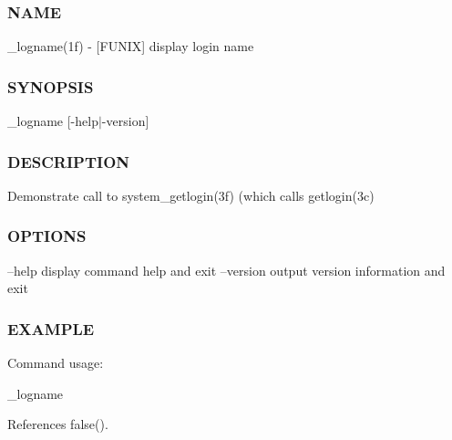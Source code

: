 \subsubsection*{N\+A\+ME}

\+\_\+logname(1f) -\/ \mbox{[}F\+U\+N\+IX\mbox{]} display login name \subsubsection*{S\+Y\+N\+O\+P\+S\+IS}

\+\_\+logname \mbox{[}-\/help$\vert$-\/version\mbox{]} \subsubsection*{D\+E\+S\+C\+R\+I\+P\+T\+I\+ON}

Demonstrate call to system\+\_\+getlogin(3f) (which calls getlogin(3c) \subsubsection*{O\+P\+T\+I\+O\+NS}

--help display command help and exit --version output version information and exit \subsubsection*{E\+X\+A\+M\+P\+LE}

\begin{DoxyVerb}   Command usage:

     _logname \end{DoxyVerb}
 

References false().

